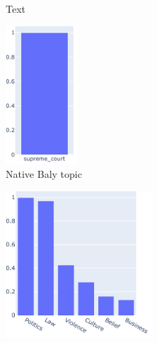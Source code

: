 \begin{figure}
	\centering
	\begin{subfigure}{\textwidth} %
		\caption{Text} %
	\end{subfigure}
	\vspace{1em} %
	\begin{subfigure}{0.45\textwidth} %
		\centering\includegraphics[width=0.29\textwidth]{figures/baly_topics.pdf}
		\caption{Native Baly topic} %
            \label{fig:topic_analysis_different_tools_baly} 
	\end{subfigure}
	\begin{subfigure}{0.45\textwidth} %
		\centering\includegraphics[width=0.6\textwidth]{figures/coarse_topics.pdf}

\end{subfigure}
\end{figure}
